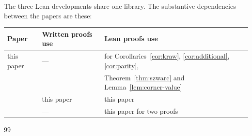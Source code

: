 The three Lean developments share one library. The substantive dependencies between the papers are these:
\begin{center}
\begin{tabular}{@{}lll@{}}
Paper & Written proofs use & Lean proofs use\\\hline
this paper & --- & \cite{P3} for Corollaries~\ref{cor:kraw}, \ref{cor:additional}, \ref{cor:parity},\\
 & & \quad Theorem~\ref{thm:szwarc} and Lemma~\ref{lem:corner-value}\\
\cite{P2} & this paper & this paper\\
\cite{P3} & --- & this paper for two proofs
\end{tabular}
\end{center}

\begin{thebibliography}{99}


\end{thebibliography}
